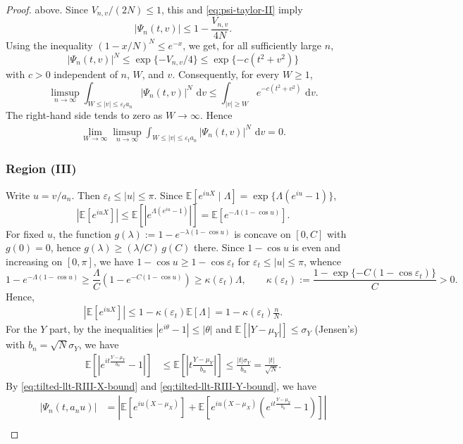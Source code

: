 \documentclass[11pt]{article}
\numberwithin{equation}{section}
\newcommand{\dd}{\,\mathrm{d}}
\newcommand{\ex}[1]{\ensuremath{\mathbb{E}\left[ #1\right]}}
\begin{document}
\begin{proof}
above. Since $V_{n,v}/(2N)\le 1$, this and \eqref{eq:psi-taylor-II} imply
\[
|\Psi_n(t,v)| \le 1-\frac{V_{n,v}}{4N}.
\]
Using the inequality $(1-x/N)^N \le e^{-x}$, we get, for all sufficiently large $n$,
\[
|\Psi_n(t,v)|^N \le \exp\{-V_{n,v}/4\} \le \exp\{-c(t^2+v^2)\}
\]
with $c>0$ independent of $n$, $W$, and $v$. Consequently, for every $W\ge1$,
\[
\limsup_{n\to\infty}
\int_{W \le |v|\le \varepsilon_t a_n}|\Psi_n(t,v)|^N\,\dd v
\le
\int_{|v|\ge W} e^{-c(t^2+v^2)}\,\dd v.
\]
The right-hand side tends to zero as $W\to\infty$. Hence
\begin{align}
    \label{eq:tilted-llt-tail-estimate-limsup}
\lim_{W\to\infty}\limsup_{n\to\infty}
\int_{W \le |v|\le \varepsilon_t a_n}|\Psi_n(t,v)|^N\,\dd v=0.
\end{align}

\subsubsection*{Region (III)}
Write $u=v/a_n$. Then $\varepsilon_t\le |u|\le \pi$. Since
$\ex{e^{iuX} \mid \Lambda} = \exp\{\Lambda(e^{iu}-1)\}$,
\[
|\ex{ e^{iuX}}|
\le
\ex{\left| e^{\Lambda(e^{iu}-1)} \right|}
=
\ex{ e^{-\Lambda(1-\cos u)}}.
\]
For fixed $u$, the function $g(\lambda) := 1-e^{-\lambda(1-\cos u)}$ is concave on $[0,C]$ with $g(0)=0$, hence $g(\lambda) \ge (\lambda/C)\, g(C)$ there. Since $1-\cos u$ is even and increasing on $[0,\pi]$, we have $1-\cos u \ge 1-\cos\varepsilon_t$ for $\varepsilon_t \le |u| \le \pi$, whence
\[
1-e^{-\Lambda(1-\cos u)}
\ge \frac{\Lambda}{C}\left(1-e^{-C(1-\cos u)}\right)
\ge \kappa(\varepsilon_t) \Lambda,
\qquad
\kappa(\varepsilon_t)
:=
\frac{1-\exp\{-C(1-\cos\varepsilon_t)\}}{C}>0.
\]
Hence, 
\begin{align}
    \label{eq:tilted-llt-RIII-X-bound}
|\ex{ e^{iuX}}|
\le 1-\kappa(\varepsilon_t) \ex{\Lambda}
=1-\kappa(\varepsilon_t)\frac nN.
\end{align}
For the $Y$ part, by the inequalities $|e^{i\theta}-1|\le|\theta|$ and $\ex{|Y-\mu_Y|}\le \sigma_Y$ (Jensen's) with $b_n=\sqrt{N}\sigma_Y$, we have
\begin{align}
    \label{eq:tilted-llt-RIII-Y-bound}
    \ex{\left|e^{it\frac{Y-\mu_Y}{b_n}}-1\right|} & 
    \le \ex{\left|t\frac{Y-\mu_Y}{b_n}\right|} \le \frac{|t| \sigma_Y}{b_n} = \frac{|t|}{\sqrt{N}}. 
\end{align}
By \eqref{eq:tilted-llt-RIII-X-bound} and \eqref{eq:tilted-llt-RIII-Y-bound}, we have
\begin{align*}
    |\Psi_n(t, a_n u)| & = \left| \ex{e^{iu(X-\mu_X)}} + \ex{e^{iu(X-\mu_X)}\left(e^{it \frac{Y-\mu_Y}{b_n}} - 1 \right)} \right| \\

\end{align*}
\end{proof}
\end{document}
